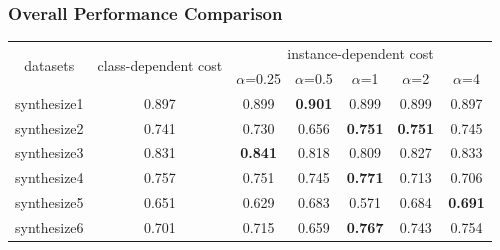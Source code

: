 \documentclass{article}
\begin{document}
\subsubsection{Overall Performance Comparison}

\begin{table}[!ht]
	\centering
	\begin{tabular}{|c||c|ccccc|}
		\hline
		\multirow{2}{*}{datasets} & \multirow{2}{*}{class-dependent cost}  &  \multicolumn{5}{c|}{instance-dependent cost}                                                                                                                           \\ \cline{3-7} 
		&                                & \multicolumn{1}{c|}{$\alpha$=0.25}         & \multicolumn{1}{c|}{$\alpha$=0.5}          & \multicolumn{1}{c|}{$\alpha$=1}            & \multicolumn{1}{c|}{$\alpha$=2}            & $\alpha$=4            \\ \hline \hline
		synthesize1               & 0.897                                 & \multicolumn{1}{c|}{0.899}          & \multicolumn{1}{c|}{\textbf{0.901}} & \multicolumn{1}{c|}{0.899}          & \multicolumn{1}{c|}{0.899}          & 0.897          \\ \hline
		synthesize2               & 0.741                               & \multicolumn{1}{c|}{0.730}          & \multicolumn{1}{c|}{0.656}          & \multicolumn{1}{c|}{\textbf{0.751}} & \multicolumn{1}{c|}{\textbf{0.751}} & 0.745          \\ \hline
		synthesize3               & 0.831                                  & \multicolumn{1}{c|}{\textbf{0.841}} & \multicolumn{1}{c|}{0.818}          & \multicolumn{1}{c|}{0.809}          & \multicolumn{1}{c|}{0.827}          & 0.833          \\ \hline
		synthesize4               & 0.757                                & \multicolumn{1}{c|}{0.751}          & \multicolumn{1}{c|}{0.745}          & \multicolumn{1}{c|}{\textbf{0.771}} & \multicolumn{1}{c|}{0.713}          & 0.706          \\ \hline
		synthesize5               & 0.651                                 & \multicolumn{1}{c|}{0.629}          & \multicolumn{1}{c|}{0.683}          & \multicolumn{1}{c|}{0.571}          & \multicolumn{1}{c|}{0.684}          & \textbf{0.691} \\ \hline
		synthesize6               & 0.701                                 & \multicolumn{1}{c|}{0.715}          & \multicolumn{1}{c|}{0.659}          & \multicolumn{1}{c|}{\textbf{0.767}} & \multicolumn{1}{c|}{0.743}          & 0.754          \\ \hline

\end{tabular}
\end{table}
\end{document}
